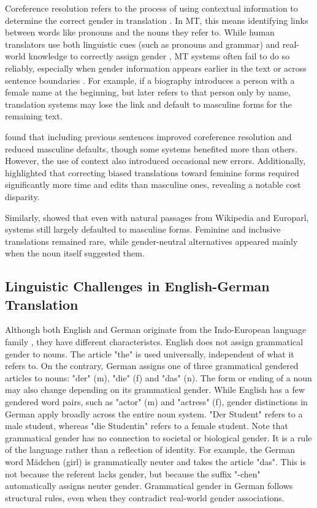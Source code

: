 Coreference resolution refers to the process of using contextual information to determine the correct gender in translation \citep{stanczakSurveyGenderBias2021}. In MT, this means identifying links between words like pronouns and the nouns they refer to. While human translators use both linguistic cues (such as pronouns and grammar) and real-world knowledge to correctly assign gender \citep{rescignoGenderBiasMachine2023}, MT systems often fail to do so reliably, especially when gender information appears earlier in the text or across sentence boundaries \citep{choMeasuringGenderBias2019,stanovskyEvaluatingGenderBias2019}. For example, if a biography introduces a person with a female name at the beginning, but later refers to that person only by name, translation systems may lose the link and default to masculine forms for the remaining text.

\citet{rescignoGenderBiasMachine2023} found that including previous sentences improved coreference resolution and reduced masculine defaults, though some systems benefited more than others. However, the use of context also introduced occasional new errors. Additionally, \citet{savoldiWhatHarmQuantifying2024} highlighted that correcting biased translations toward feminine forms required significantly more time and edits than masculine ones, revealing a notable cost disparity.

Similarly, \citet{lardelliBuildingBridgesDataset2024} showed that even with natural passages from Wikipedia and Europarl, systems still largely defaulted to masculine forms. Feminine and inclusive translations remained rare, while gender-neutral alternatives appeared mainly when the noun itself suggested them.


\subsection{Linguistic Challenges in English-German Translation}

Although both English and German originate from the Indo-European language family \citep{baldiEnglishIndoEuropeanLanguage2008}, they have different characteristcs. English does not assign grammatical gender to nouns. The article "the" is used universally, independent of what it refers to. On the contrary, German assigns one of three grammatical gendered articles to nouns: "der" (m), "die" (f) and "das" (n). The form or ending of a noun may also change depending on its grammatical gender. While English has a few gendered word pairs, such as "actor" (m) and "actress" (f), gender distinctions in German apply broadly across the entire noun system. "Der Student" refers to a male student, whereas "die Studentin" refers to a female student. Note that grammatical gender has no connection to societal or biological gender. It is a rule of the language rather than a reflection of identity. For example, the German word Mädchen (girl) is grammatically neuter and takes the article "das". This is not because the referent lacks gender, but because the suffix "-chen" automatically assigns neuter gender. Grammatical gender in German follows structural rules, even when they contradict real-world gender associations.

